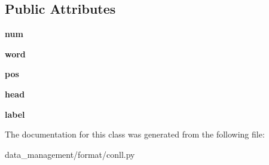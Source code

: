 \subsection*{Public Attributes}
\begin{DoxyCompactItemize}
\item 
\hypertarget{classformat_1_1conll_1_1ConllWord_af30e4fe3d25dbc554344f19a4b885494}{
{\bfseries num}}
\label{classformat_1_1conll_1_1ConllWord_af30e4fe3d25dbc554344f19a4b885494}

\item 
\hypertarget{classformat_1_1conll_1_1ConllWord_adadded95ad1ac3f2028b9c22e0bdf3ca}{
{\bfseries word}}
\label{classformat_1_1conll_1_1ConllWord_adadded95ad1ac3f2028b9c22e0bdf3ca}

\item 
\hypertarget{classformat_1_1conll_1_1ConllWord_a5c51b02c86ab39e5f1d38eab2eb4af12}{
{\bfseries pos}}
\label{classformat_1_1conll_1_1ConllWord_a5c51b02c86ab39e5f1d38eab2eb4af12}

\item 
\hypertarget{classformat_1_1conll_1_1ConllWord_a8a15501900b7ad9fcbfde965b50ec055}{
{\bfseries head}}
\label{classformat_1_1conll_1_1ConllWord_a8a15501900b7ad9fcbfde965b50ec055}

\item 
\hypertarget{classformat_1_1conll_1_1ConllWord_a64e431b7573fda235d21f7693edc7108}{
{\bfseries label}}
\label{classformat_1_1conll_1_1ConllWord_a64e431b7573fda235d21f7693edc7108}

\end{DoxyCompactItemize}


The documentation for this class was generated from the following file:\begin{DoxyCompactItemize}
\item 
data\_\-management/format/conll.py\end{DoxyCompactItemize}
